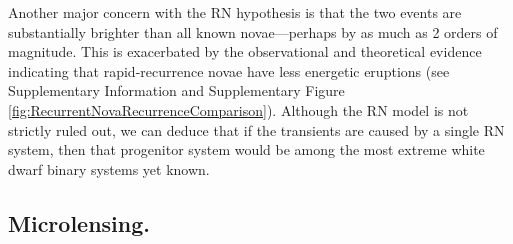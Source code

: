Another major concern with the RN hypothesis is that the two \spock
events are substantially brighter than all known novae---perhaps by as
much as 2 orders of magnitude.  This is exacerbated by the
observational and theoretical evidence indicating that
rapid-recurrence novae have less energetic eruptions\cite{Yaron:2005}
(see Supplementary Information and Supplementary Figure
\ref{fig:RecurrentNovaRecurrenceComparison}).
Although the RN model
is not strictly ruled out, we can deduce that if the \spock transients
are caused by a single RN system, then that progenitor system would be
among the most extreme white dwarf binary systems yet known.




\subsection{Microlensing.}\label{sec:MicroLensing}

